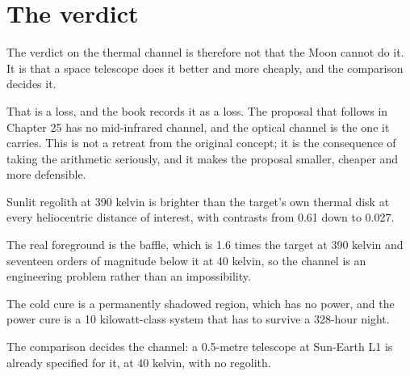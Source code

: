 \section{The verdict}

The verdict on the thermal channel is therefore not that the Moon cannot do
it. It is that a space telescope does it better and more cheaply, and the
comparison decides it.

That is a loss, and the book records it as a loss. The proposal that follows
in Chapter 25 has no mid-infrared channel, and the optical channel is the
one it carries. This is not a retreat from the original concept; it is the
consequence of taking the arithmetic seriously, and it makes the proposal
smaller, cheaper and more defensible.

\begin{keytakeaways}
\item Sunlit regolith at 390 kelvin is brighter than the target's own
thermal disk at every heliocentric distance of interest, with contrasts
from 0.61 down to 0.027.
\item The real foreground is the baffle, which is 1.6 times the target at
390 kelvin and seventeen orders of magnitude below it at 40 kelvin, so the
channel is an engineering problem rather than an impossibility.
\item The cold cure is a permanently shadowed region, which has no power,
and the power cure is a 10 kilowatt-class system that has to survive a
328-hour night.
\item The comparison decides the channel: a 0.5-metre telescope at
Sun-Earth L1 is already specified for it, at 40 kelvin, with no regolith.
\end{keytakeaways}
